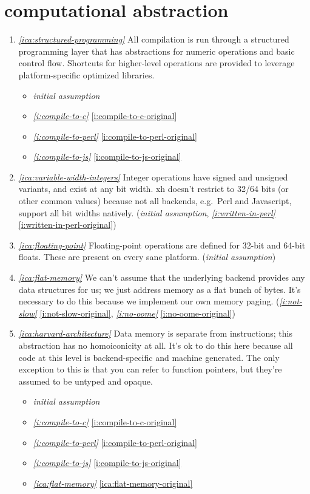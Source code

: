 \documentclass{report}
\makeatletter
\newcommand*{\Label}[2]{%
  \@bsphack
  \begingroup
    \label{#1-original}%
    \def\@currentlabel{#2}%
    \label{#1}%
  \endgroup
  \@esphack
}
\newcommand{\initial}{{\em initial assumption}}
\newcommand{\refboth}[1]{{\em \ref{#1}} \ref{#1-original}}
\makeatother
\begin{document}
\chapter{computational abstraction}\label{chp:computational-abstraction}
\begin{enumerate}
\item{}\Label{ica:structured-programming}{ca.structured}{\em\ref{ica:structured-programming}}
  All compilation is run through a structured programming layer that has
  abstractions for numeric operations and basic control flow. Shortcuts for
  higher-level operations are provided to leverage platform-specific
  optimized libraries.
\begin{itemize}
\item \initial
\item \refboth{i:compile-to-c}
\item \refboth{i:compile-to-perl}
\item \refboth{i:compile-to-js}
\end{itemize}

\item{}\Label{ica:variable-width-integers}{ca.varwidthint}{\em\ref{ica:variable-width-integers}}
  Integer operations have signed and unsigned variants, and exist at any
  bit width. xh doesn't restrict to 32/64 bits (or other common values)
  because not all backends, e.g.~Perl and Javascript, support all bit
  widths natively.
(\initial, \refboth{i:written-in-perl})
\item{}\Label{ica:floating-point}{ca.float}{\em\ref{ica:floating-point}}
  Floating-point operations are defined for 32-bit and 64-bit floats. These
  are present on every sane platform.
(\initial)
\item{}\Label{ica:flat-memory}{ca.flatmemory}{\em\ref{ica:flat-memory}}
  We can't assume that the underlying backend provides any data structures
  for us; we just address memory as a flat bunch of bytes. It's necessary
  to do this because we implement our own memory paging.
(\refboth{i:not-slow}, \refboth{i:no-oome})

\item{}\Label{ica:harvard-architecture}{ca.harvard}{\em\ref{ica:harvard-architecture}}
  Data memory is separate from instructions; this abstraction has no
  homoiconicity at all. It's ok to do this here because all code at this
  level is backend-specific and machine generated. The only exception to
  this is that you can refer to function pointers, but they're assumed to
  be untyped and opaque.
\begin{itemize}
\item \initial
\item \refboth{i:compile-to-c}
\item \refboth{i:compile-to-perl}
\item \refboth{i:compile-to-js}
\item \refboth{ica:flat-memory}
\end{itemize}


\end{enumerate}
\end{document}
